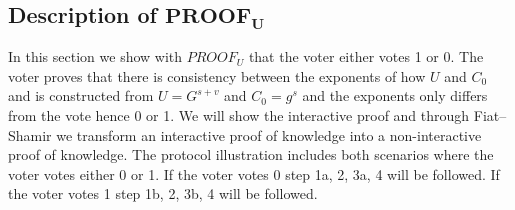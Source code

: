 \subsection{Description of $ \mathbf{PROOF_U} $}
In this section we show with $PROOF_U$ that the voter either votes  1 or 0. The voter proves that there is consistency between the exponents of how \begin{math}U\end{math} and \begin{math}C_0\end{math} and is constructed from \begin{math}U=G^{s+v}\end{math} and \begin{math}C_0 = g^s\end{math} and the exponents only differs from the vote hence 0 or 1. We will show the interactive proof and through Fiat–Shamir  we transform an interactive proof of knowledge into a non-interactive proof of knowledge. The protocol illustration includes both scenarios where the voter votes either 0 or 1. If the voter votes 0 step 1a, 2, 3a, 4 will be followed. If the voter votes 1 step 1b, 2, 3b, 4 will be followed.\\

